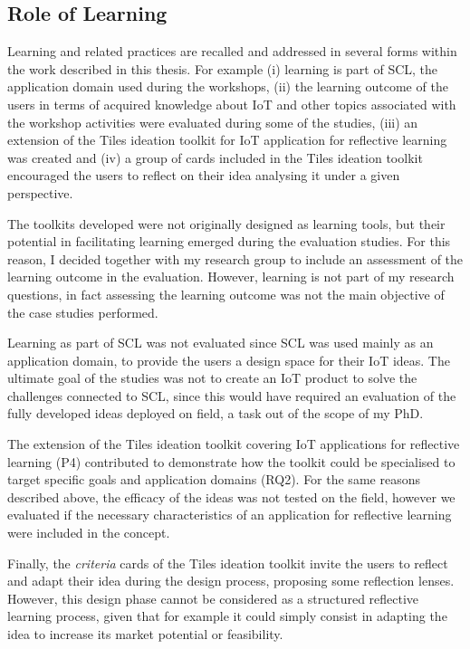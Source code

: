 \subsection{Role of Learning}
Learning and related practices are recalled and addressed in several forms within the work described in this thesis.
For example (i) learning is part of SCL, the application domain used during the workshops, (ii) the learning outcome of the users in terms of acquired knowledge about IoT and other topics associated with the workshop activities were evaluated during some of the studies, (iii) an extension of the Tiles ideation toolkit for IoT application for reflective learning was created and (iv) a group of cards included in the Tiles ideation toolkit encouraged the users to reflect on their idea analysing it under a given perspective.

The toolkits developed were not originally designed as learning tools, but their potential in facilitating learning emerged during the evaluation studies. For this reason, I decided together with my research group to include an assessment of the learning outcome in the evaluation. However, learning is not part of my research questions, in fact assessing the learning outcome was not the main objective of the case studies performed.

Learning as part of SCL was not evaluated since SCL was used mainly as an application domain, to provide the users a design space for their IoT ideas. The ultimate goal of the studies was not to create an IoT product to solve the challenges connected to SCL, since this would have required an evaluation of the fully developed ideas deployed on field, a task out of the scope of my PhD.

The extension of the Tiles ideation toolkit covering IoT applications for reflective learning (P4) contributed to demonstrate how the toolkit could be specialised to target specific goals and application domains (RQ2). For the same reasons described above, the efficacy of the ideas was not tested on the field, however we evaluated if the necessary characteristics of an application for reflective learning were included in the concept.

Finally, the \textit{criteria} cards of the Tiles ideation toolkit invite the users to reflect and adapt their idea during the design process, proposing some reflection lenses. However, this design phase cannot be considered as a structured reflective learning process, given that for example it could simply consist in adapting the idea to increase its market potential or feasibility.


